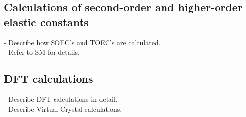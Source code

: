\documentclass[showpacs,aps,floatfix,prb,reprint,superscriptaddress]{revtex4-1}
\begin{document}
\subsection{Calculations of second-order and higher-order elastic constants}
- Describe how SOEC's and TOEC's are calculated. \\
- Refer to SM for details.


\subsection{DFT calculations}
- Describe DFT calculations in detail. \\
- Describe Virtual Crystal calculations. 
\end{document}
